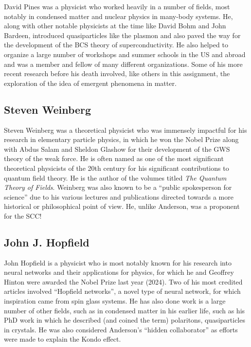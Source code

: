 David Pines was a physicist who worked heavily in a number of fields, most notably in condensed matter and nuclear physics in many-body systems. He, along with other notable physicists at the time like David Bohm and John Bardeen, introduced quasiparticles like the plasmon and also paved the way for the development of the BCS theory of superconductivity. He also helped to organize a large number of workshops and summer schools in the US and abroad and was a member and fellow of many different organizations. Some of his more recent research before his death involved, like others in this assignment, the exploration of the idea of emergent phenomena in matter.


\subsection{Steven Weinberg}

Steven Weinberg was a theoretical physicist who was immensely impactful for his research in elementary particle physics, in which he won the Nobel Prize along with Abdus Salam and Sheldon Glashow for their development of the GWS theory of the weak force. He is often named as one of the most significant theoretical physicists of the 20th century for his significant contributions to quantum field theory. He is the author of the volumes titled \textit{The Quantum Theory of Fields}. Weinberg was also known to be a ``public spokesperson for science'' due to his various lectures and publications directed towards a more historical or philosophical point of view. He, unlike Anderson, was a proponent for the SCC!



\subsection{John J. Hopfield}

John Hopfield is a physicist who is most notably known for his research into neural networks and their applications for physics, for which he and Geoffrey Hinton were awarded the Nobel Prize last year (2024). Two of his most credited articles involved ``Hopfield networks'', a novel type of neural network, for which inspiration came from spin glass systems. He has also done work is a large number of other fields, such as in condensed matter in his earlier life, such as his PhD work in which he described (and coined the term) polaritons, quasiparticles in crystals. He was also considered Anderson's ``hidden collaborator'' as efforts were made to explain the Kondo effect.


